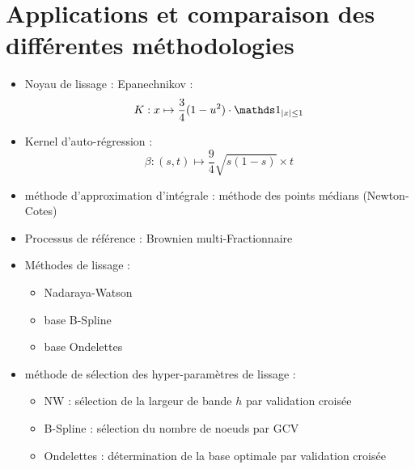 \chapter{Applications et comparaison des différentes méthodologies}
\minitoc%


\begin{itemize}
    \item Noyau de lissage : Epanechnikov :
    $$K : x \mapsto \frac 3 4 (1 - u^2)\cdot \indicatrice{|x| \leq 1}$$
    \item Kernel d'auto-régression : 
    $$\beta : (s,t) \mapsto \frac 9 4 \sqrt{s(1-s)} \times t$$
    \item méthode d'approximation d'intégrale : méthode des points médians (Newton-Cotes)
    \item Processus de référence : Brownien multi-Fractionnaire
    \citationrequise
    \item Méthodes de lissage : 
    \begin{itemize}
        \item Nadaraya-Watson
        \item base B-Spline
        \item base Ondelettes
    \end{itemize}
    \item méthode de sélection des hyper-paramètres de lissage :
    \begin{itemize}
        \item NW : sélection de la largeur de bande $h$ par validation croisée
        \item B-Spline : sélection du nombre de noeuds par GCV
        \item Ondelettes : détermination de la base optimale par validation croisée
    \end{itemize}
\end{itemize}


